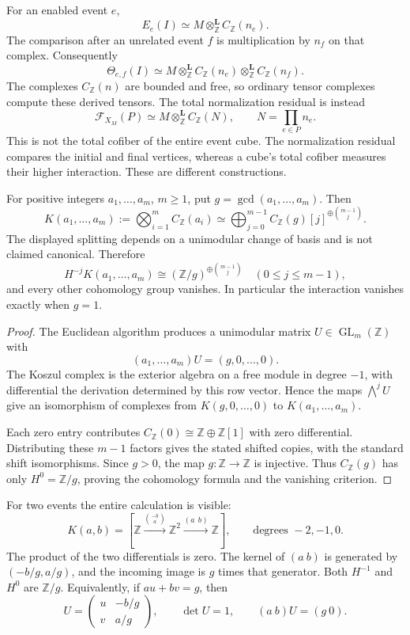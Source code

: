 For an enabled event $e$,
\[
 E_e(I)\simeq M\otimes^{\mathbf L}_{\mathbb Z}C_{\mathbb Z}(n_e).
\]
The comparison after an unrelated event $f$ is multiplication by $n_f$ on that complex. Consequently
\[
 \boxed{\Theta_{e,f}(I)\simeq
 M\otimes^{\mathbf L}_{\mathbb Z}
 C_{\mathbb Z}(n_e)\otimes^{\mathbf L}_{\mathbb Z}C_{\mathbb Z}(n_f).}
\]
The complexes $C_{\mathbb Z}(n)$ are bounded and free, so ordinary tensor complexes compute these derived tensors. The total normalization residual is instead
\[
 \mathcal F_{X_M}(P)\simeq
 M\otimes^{\mathbf L}_{\mathbb Z}C_{\mathbb Z}(N),
 \qquad N=\prod_{e\in P}n_e.
\]
This is not the total cofiber of the entire event cube. The normalization residual compares the initial and final vertices, whereas a cube's total cofiber measures their higher interaction. These are different constructions.

\begin{theorem}\label{thm:integral-gcd}
For positive integers $a_1,\ldots,a_m$, $m\ge1$, put $g=\gcd(a_1,\ldots,a_m)$. Then
\[
 K(a_1,\ldots,a_m):=
 \bigotimes_{i=1}^m C_{\mathbb Z}(a_i)
 \simeq\bigoplus_{j=0}^{m-1}
 C_{\mathbb Z}(g)[j]^{\oplus\binom{m-1}{j}}.
\]
The displayed splitting depends on a unimodular change of basis and is not claimed canonical. Therefore
\[
 H^{-j}K(a_1,\ldots,a_m)\cong
 (\mathbb Z/g)^{\oplus\binom{m-1}{j}}
 \quad(0\le j\le m-1),
\]
and every other cohomology group vanishes. In particular the interaction vanishes exactly when $g=1$.
\end{theorem}

\begin{proof}
The Euclidean algorithm produces a unimodular matrix $U\in\operatorname{GL}_m(\mathbb Z)$ with
\[
 (a_1,\ldots,a_m)U=(g,0,\ldots,0).
\]
The Koszul complex is the exterior algebra on a free module in degree $-1$, with differential the derivation determined by this row vector. Hence the maps $\bigwedge^jU$ give an isomorphism of complexes from $K(g,0,\ldots,0)$ to $K(a_1,\ldots,a_m)$.

Each zero entry contributes $C_{\mathbb Z}(0)\cong\mathbb Z\oplus\mathbb Z[1]$ with zero differential. Distributing these $m-1$ factors gives the stated shifted copies, with the standard shift isomorphisms. Since $g>0$, the map $g:\mathbb Z\to\mathbb Z$ is injective. Thus $C_{\mathbb Z}(g)$ has only $H^0=\mathbb Z/g$, proving the cohomology formula and the vanishing criterion.
\end{proof}

For two events the entire calculation is visible:
\[
 K(a,b)=\left[
 \mathbb Z\xrightarrow{\binom{-b}{a}}
 \mathbb Z^2\xrightarrow{(a\ \ b)}\mathbb Z
 \right],
 \qquad\text{degrees }-2,-1,0.
\]
The product of the two differentials is zero. The kernel of $(a\ b)$ is generated by $(-b/g,a/g)$, and the incoming image is $g$ times that generator. Both $H^{-1}$ and $H^0$ are $\mathbb Z/g$. Equivalently, if $au+bv=g$, then
\[
 U=\begin{pmatrix}u&-b/g\\v&a/g\end{pmatrix},
 \qquad\det U=1,
 \qquad(a\ b)U=(g\ 0).
\]

